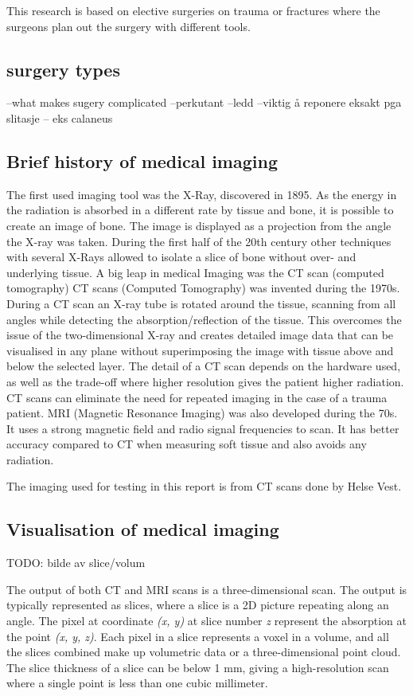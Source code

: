 \documentclass[a4paper]{report}
\begin{document}
This research is based on elective surgeries on trauma or fractures where the surgeons plan out the surgery with different tools. 
\subsection{surgery types}
--what makes sugery complicated
--perkutant
--ledd
--viktig å reponere eksakt pga slitasje
-- eks calaneus

\subsection{Brief history of medical imaging}
The first used imaging tool was the X-Ray, discovered in 1895\cite{hamblen_outline_2010}\cite{suetens_fundamentals_2017}. As the energy in the radiation is absorbed in a different rate by tissue and bone, it is possible to create an image of bone. The image is displayed as a projection from the angle the X-ray was taken. During the first half of the 20th century other techniques with several X-Rays allowed to isolate a slice of bone without over- and underlying tissue. A big leap in medical Imaging was the CT scan (computed tomography)\cite{bradley_history_2008}
CT scans (Computed Tomography) was invented during the 1970s. During a CT scan an X-ray tube is rotated around the tissue, scanning from all angles while detecting the absorption/reflection of the tissue. This overcomes the issue of the two-dimensional X-ray and creates detailed image data that can be visualised in any plane without superimposing the image with tissue above and below the selected layer\cite{hamblen_outline_2010}. The detail of a CT scan depends on the hardware used, as well as the trade-off where higher resolution gives the patient higher radiation\cite{bradley_history_2008}. CT scans can eliminate the need for repeated imaging in the case of a trauma patient\cite{swiontkowski_manual_2013}.
MRI (Magnetic Resonance Imaging) was also developed during the 70s. It uses a strong magnetic field and radio signal frequencies to scan. It has better accuracy compared to CT when measuring soft tissue and also avoids any radiation.


The imaging used for testing in this report is from CT scans done by Helse Vest.
\subsection{Visualisation of medical imaging}
TODO: bilde av slice/volum

The output of both CT and MRI scans is a three-dimensional scan. The output is typically represented as slices, where a slice is a 2D picture repeating along an angle. The pixel at coordinate \emph{(x, y)} at slice number \emph{z} represent the absorption at the point \emph{(x, y, z)}\cite{chougule_conversions_2013}.
Each pixel in a slice represents a voxel in a volume, and all the slices combined make up volumetric data or a three-dimensional point cloud\cite{chougule_conversions_2013}.
The slice thickness of a slice can be below 1 mm, giving a high-resolution scan where a single point is less than one cubic millimeter\cite{hamblen_outline_2010}.
\end{document}
